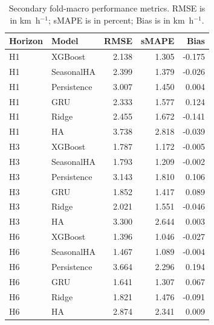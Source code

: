 \begin{table}[!htbp]
\centering
\caption{Secondary fold-macro performance metrics. RMSE is in km~h$^{-1}$; sMAPE is in percent; Bias is in km~h$^{-1}$.}
\label{tab:secondary_metrics}
\footnotesize
\begin{tabular}{|l|l|r|r|r|}
\hline
\textbf{Horizon} & \textbf{Model} & \textbf{RMSE} & \textbf{sMAPE} & \textbf{Bias} \\
\hline
H1 & XGBoost     & 2.138 & 1.305 & -0.175 \\ 
\hline
H1 & SeasonalHA  & 2.399 & 1.379 & -0.026 \\ 
\hline
H1 & Persistence & 3.007 & 1.450 &  0.004 \\ 
\hline
H1 & GRU         & 2.333 & 1.577 &  0.124 \\ 
\hline
H1 & Ridge       & 2.455 & 1.672 & -0.141 \\ 
\hline
H1 & HA          & 3.738 & 2.818 & -0.039 \\
\hline
H3 & XGBoost     & 1.787 & 1.172 & -0.005 \\ 
\hline
H3 & SeasonalHA  & 1.793 & 1.209 & -0.002 \\ 
\hline
H3 & Persistence & 3.143 & 1.810 &  0.106 \\ 
\hline
H3 & GRU         & 1.852 & 1.417 &  0.089 \\ 
\hline
H3 & Ridge       & 2.021 & 1.551 & -0.046 \\ 
\hline
H3 & HA          & 3.300 & 2.644 &  0.003 \\
\hline
H6 & XGBoost     & 1.396 & 1.046 & -0.027 \\ 
\hline
H6 & SeasonalHA  & 1.467 & 1.089 & -0.004 \\ 
\hline
H6 & Persistence & 3.664 & 2.296 &  0.194 \\ 
\hline
H6 & GRU         & 1.641 & 1.307 &  0.067 \\ 
\hline
H6 & Ridge       & 1.821 & 1.476 & -0.091 \\ 
\hline
H6 & HA          & 2.874 & 2.341 &  0.009 \\
\hline
\end{tabular}
\end{table}
